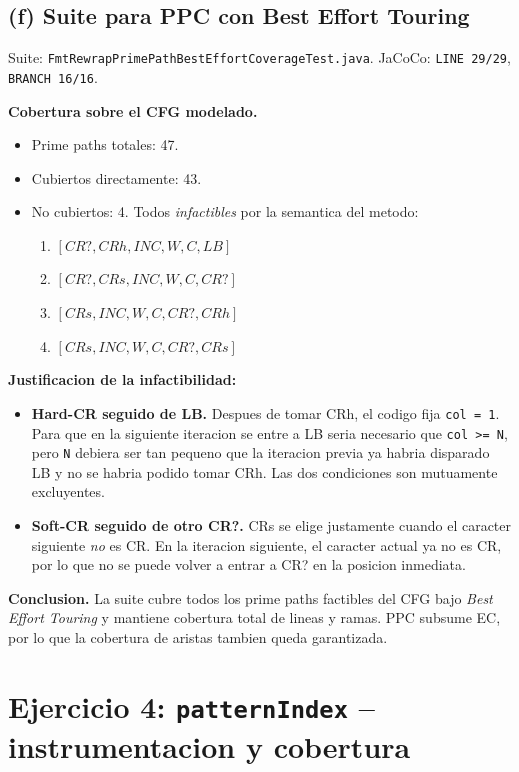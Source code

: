 \documentclass[12pt,a4paper]{article}
\begin{document}
\subsection{(f) Suite para PPC con Best Effort Touring}

Suite: \texttt{FmtRewrapPrimePathBestEffortCoverageTest.java}. JaCoCo: \texttt{LINE 29/29},
\texttt{BRANCH 16/16}.

\textbf{Cobertura sobre el CFG modelado.}
\begin{itemize}
  \item Prime paths totales: 47.
  \item Cubiertos directamente: 43.
  \item No cubiertos: 4. Todos \emph{infactibles} por la semantica del metodo:
  \begin{enumerate}
    \item $[CR?, CRh, INC, W, C, LB]$
    \item $[CR?, CRs, INC, W, C, CR?]$
    \item $[CRs, INC, W, C, CR?, CRh]$
    \item $[CRs, INC, W, C, CR?, CRs]$
  \end{enumerate}
\end{itemize}

\textbf{Justificacion de la infactibilidad:}
\begin{itemize}
  \item \textbf{Hard-CR seguido de LB.} Despues de tomar CRh, el codigo fija \texttt{col = 1}.
  Para que en la siguiente iteracion se entre a LB seria necesario que \texttt{col >= N}, pero
  \texttt{N} debiera ser tan pequeno que la iteracion previa ya habria disparado LB y no se
  habria podido tomar CRh. Las dos condiciones son mutuamente excluyentes.

  \item \textbf{Soft-CR seguido de otro CR?.} CRs se elige justamente cuando el caracter
  siguiente \emph{no} es CR. En la iteracion siguiente, el caracter actual ya no es CR, por lo
  que no se puede volver a entrar a CR? en la posicion inmediata.
\end{itemize}

\textbf{Conclusion.} La suite cubre todos los prime paths factibles del CFG bajo \textit{Best
Effort Touring} y mantiene cobertura total de lineas y ramas. PPC subsume EC, por lo que la
cobertura de aristas tambien queda garantizada.

\section{Ejercicio 4: \texttt{patternIndex} -- instrumentacion y cobertura}
\end{document}
